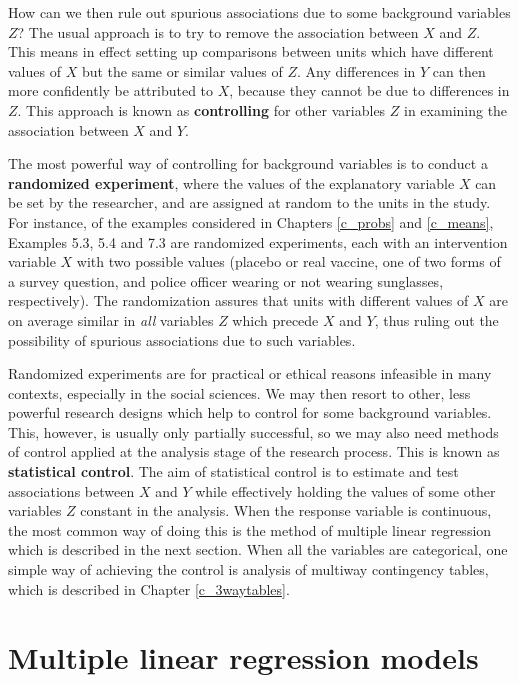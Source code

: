 How can we then rule out spurious associations due to some background
variables $Z$? The usual approach is to try to remove the association
between $X$ and $Z$. This means in effect setting up comparisons between
units which have different values of $X$ but the same or similar values
of $Z$. Any differences in $Y$ can then more confidently be attributed
to $X$, because they cannot be due to differences in $Z$. This approach
is known as \textbf{controlling} for other variables $Z$ in examining
the association between $X$ and $Y$.

The most powerful way of controlling for background variables is to
conduct a \textbf{randomized experiment}, where the values of the
explanatory variable $X$ can be set by the researcher, and are
assigned at random to the units in the study. For instance, of the
examples considered in Chapters
\ref{c_probs} and
\ref{c_means}, Examples 5.3, 5.4 and 7.3
are randomized experiments, each with an intervention variable $X$ with
two possible values (placebo or real vaccine,
one of two forms of a survey question, and
police officer wearing or not wearing sunglasses,
respectively). The randomization assures that units with different
values of $X$ are on average similar in \emph{all} variables $Z$ which
precede $X$ and $Y$, thus ruling out the possibility of spurious
associations due to such variables.

Randomized experiments are for practical or ethical reasons infeasible
in many contexts, especially in the social sciences. We may then resort
to other, less powerful research designs
which help to control for some background variables. This, however, is usually
only partially successful, so we may also need methods of control
applied at the analysis stage of the research process. This is known as
\textbf{statistical control}. The aim of statistical control is to
estimate and test associations between $X$ and $Y$ while effectively
holding the values of some other variables $Z$ constant in the analysis.
When the response variable is continuous, the most common way of doing this
is the method of multiple linear regression which is described in the next section.
When all the variables are categorical, one simple way of achieving the
control is analysis of multiway contingency tables, which is described in Chapter
\ref{c_3waytables}.

\section{Multiple linear regression models}
\label{s_regression_multiple}

